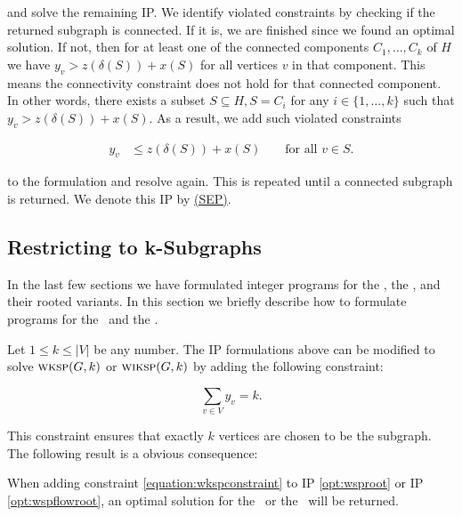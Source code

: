 and solve the remaining IP. We identify violated constraints by checking if the returned subgraph is connected. If it is, we are finished since we found an optimal solution. If not, then for at least one of the connected components $C_1, \ldots, C_k$ of $H$ we have $y_v > z(\delta(S)) + x(S)$ for all vertices $v$ in that component. This means the connectivity constraint does not hold for that connected component. In other words, there exists a subset $S \subseteq H, S = C_i$ for any $i \in \{1, \ldots, k\}$ such that $y_v > z(\delta(S)) + x(S)$. As a result, we add such violated constraints

\begin{align*}
	y_v &\leq z(\delta(S)) + x(S) &&\text{ for all } v \in S.
\end{align*}

to the formulation and resolve again. This is repeated until a connected subgraph is returned. We denote this IP by \href{sec:integer:seperation}{(SEP)}.


\subsection{Restricting to k-Subgraphs}
\label{sec:integer:kwsp}

In the last few sections we have formulated integer programs for the \WSP, the \WISP, and their rooted variants. In this section we briefly describe how to formulate programs for the \WkSP\ and the \WIkSP.\medskip

Let $1 \leq k \leq |V|$ be any number. The IP formulations above can be modified to solve $\textsc{wksp}(G,k)$ or $\textsc{wiksp}(G,k)$ by adding the following constraint:

\begin{equation}
	\label{equation:wkspconstraint}
	\sum_{v \in V} y_v = k.
\end{equation}

This constraint ensures that exactly $k$ vertices are chosen to be the subgraph. The following result is a obvious consequence:

\begin{corollary}
	When adding constraint \eqref{equation:wkspconstraint} to IP \eqref{opt:wsproot} or IP \eqref{opt:wspflowroot}, an optimal solution for the \WIkSP\ or the \WkSP\ will be returned.
\end{corollary}